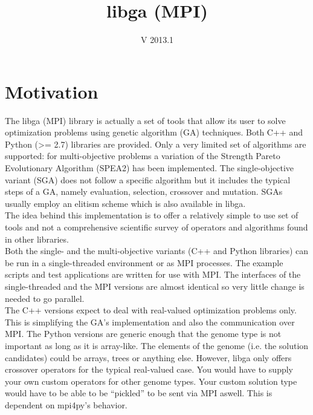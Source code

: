 \documentclass[12pt]{article}
\begin{document}
\title{libga (MPI)}
\date{V 2013.1}
\maketitle
\thispagestyle{empty}

\tableofcontents


\section{Motivation}
The libga (MPI) library is actually a set of tools that allow its user to solve optimization problems using genetic algorithm (GA) techniques. Both C++ and Python (>= 2.7) libraries are provided. Only a very limited set of algorithms are supported: for multi-objective problems a variation of the Strength Pareto Evolutionary Algorithm (SPEA2) \cite{Zitzler01spea2:improving} has been implemented. The single-objective variant (SGA) does not follow a specific algorithm but it includes the typical steps of a GA, namely evaluation, selection, crossover and mutation. SGAs usually employ an elitism scheme which is also available in libga. \\
The idea behind this implementation is to offer a relatively simple to use set of tools and not a comprehensive scientific survey of operators and algorithms found in other libraries. \\
Both the single- and the multi-objective variants (C++ and Python libraries) can be run in a single-threaded environment or as MPI processes. The example scripts and test applications are written for use with MPI. The interfaces of the single-threaded and the MPI versions are almost identical so very little change is needed to go parallel. \\
The C++ versions expect to deal with real-valued optimization problems only. This is simplifying the GA's implementation and also the communication over MPI. The Python versions are generic enough that the genome type is not important as long as it is array-like. The elements of the genome (i.e. the solution candidates) could be arrays, trees or anything else. However, libga only offers crossover operators for the typical real-valued case. You would have to supply your own custom operators for other genome types. Your custom solution type would have to be able to be ``pickled'' to be sent via MPI aswell. This is dependent on mpi4py's behavior. 
\end{document}
